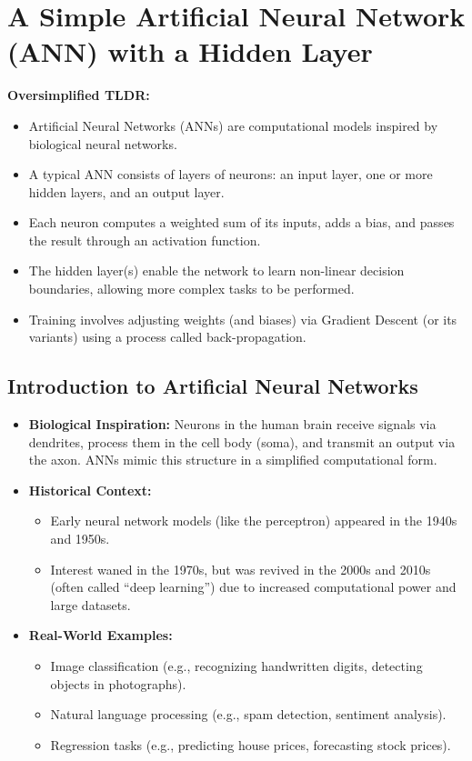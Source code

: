 \documentclass{article}
\begin{document}
\section{A Simple Artificial Neural Network (ANN) with a Hidden Layer}

\textbf{Oversimplified TLDR:}
\begin{itemize}
    \item Artificial Neural Networks (ANNs) are computational models inspired by biological neural networks.
    \item A typical ANN consists of layers of neurons: an input layer, one or more hidden layers, and an output layer.
    \item Each neuron computes a weighted sum of its inputs, adds a bias, and passes the result through an activation function.
    \item The hidden layer(s) enable the network to learn non-linear decision boundaries, allowing more complex tasks to be performed.
    \item Training involves adjusting weights (and biases) via Gradient Descent (or its variants) using a process called back-propagation.
\end{itemize}

\subsection{Introduction to Artificial Neural Networks}

\begin{itemize}
    \item \textbf{Biological Inspiration:} Neurons in the human brain receive signals via dendrites, process them in the cell body (soma), and transmit an output via the axon. ANNs mimic this structure in a simplified computational form.
    \item \textbf{Historical Context:}
    \begin{itemize}
        \item Early neural network models (like the perceptron) appeared in the 1940s and 1950s.
        \item Interest waned in the 1970s, but was revived in the 2000s and 2010s (often called ``deep learning'') due to increased computational power and large datasets.
    \end{itemize}
    \item \textbf{Real-World Examples:}
    \begin{itemize}
        \item Image classification (e.g., recognizing handwritten digits, detecting objects in photographs).
        \item Natural language processing (e.g., spam detection, sentiment analysis).
        \item Regression tasks (e.g., predicting house prices, forecasting stock prices).
    \end{itemize}
\end{itemize}
\end{document}
